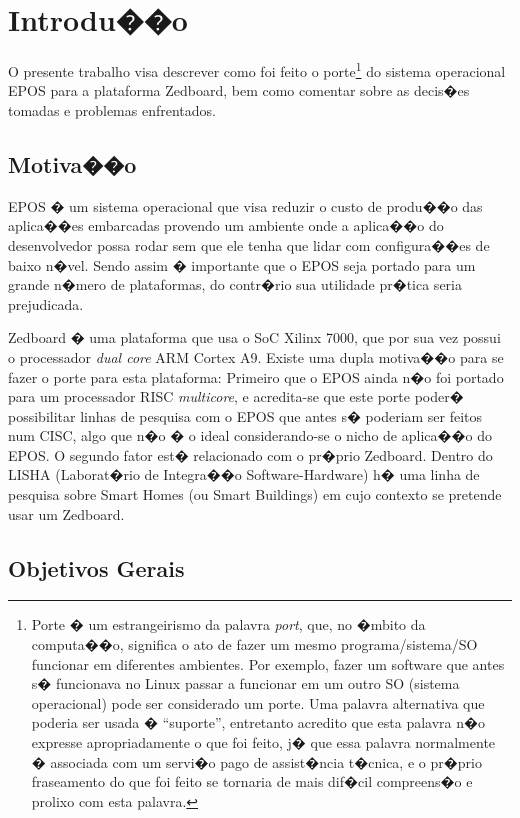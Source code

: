 \documentclass{ufscThesis/ufscThesis} %
\begin{document}
\chapter{Introdu��o}

O presente trabalho visa descrever como foi feito o porte\footnote{Porte � um estrangeirismo da palavra \emph{port}, que, no �mbito da computa��o, significa o ato de fazer um mesmo programa/sistema/SO funcionar em diferentes ambientes. Por exemplo, fazer um software que antes s� funcionava no Linux passar a funcionar em um outro SO (sistema operacional) pode ser considerado um porte. Uma palavra alternativa que poderia ser usada � ``suporte'', entretanto acredito que esta palavra n�o expresse apropriadamente o que foi feito, j� que essa palavra normalmente � associada com um servi�o pago de assist�ncia t�cnica, e o pr�prio fraseamento do que foi feito se tornaria de mais dif�cil compreens�o e prolixo com esta palavra.} do sistema operacional EPOS para a plataforma Zedboard, bem como comentar sobre as decis�es tomadas e problemas enfrentados.

\section{Motiva��o}
EPOS � um sistema operacional que visa reduzir o custo de produ��o das aplica��es embarcadas provendo um ambiente onde a aplica��o do desenvolvedor possa rodar sem que ele tenha que lidar com configura��es de baixo n�vel. Sendo assim � importante que o EPOS seja portado para um grande n�mero de plataformas, do contr�rio sua utilidade pr�tica seria prejudicada.

Zedboard � uma plataforma que usa o SoC Xilinx 7000, que por sua vez possui o processador \emph{dual core} ARM Cortex A9. Existe uma dupla motiva��o para se fazer o porte para esta plataforma: Primeiro que o EPOS ainda n�o foi portado para um processador RISC \emph{multicore}, e acredita-se que este porte poder� possibilitar linhas de pesquisa com o EPOS que antes s� poderiam ser feitos num CISC, algo que n�o � o ideal considerando-se o nicho de aplica��o do EPOS. O segundo fator est� relacionado com o pr�prio Zedboard. Dentro do LISHA (Laborat�rio de Integra��o Software-Hardware) h� uma linha de pesquisa sobre Smart Homes (ou Smart Buildings) em cujo contexto se pretende usar um Zedboard.

\section{Objetivos Gerais}
\end{document}
